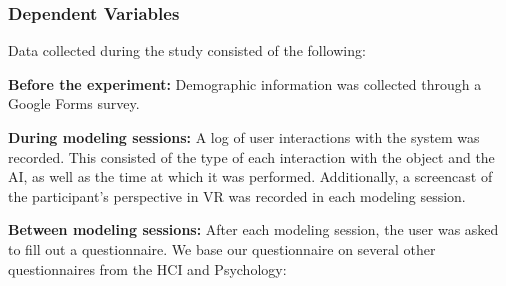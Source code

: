 \subsubsection{Dependent Variables}
Data collected during the study consisted of the following:

\newcommand{\paragraphB}[1]{{\textbf{#1}}}
\paragraphB{Before the experiment:} Demographic information was collected through a Google Forms survey.

\paragraphB{During modeling sessions:} A log of user interactions with the system was recorded. This consisted of the type of each interaction with the object and the AI, as well as the time at which it was performed. Additionally, a screencast of the participant's perspective in VR was recorded in each modeling session.

\paragraphB{Between modeling sessions:} After each modeling session, the user was asked to fill out a questionnaire.
We base our questionnaire on several other questionnaires from the HCI and Psychology:

